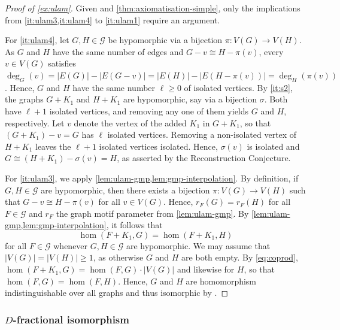 \documentclass[11pt]{scrartcl}
\theoremstyle{definition}
\theoremstyle{plain}
\theoremstyle{remark}
\newcommand{\G}{\mathcal{G}}
\begin{document}
    \begin{proof}[Proof of \cref{ex:ulam}]
		Given \cite{lovasz_operations_1967} and \cref{thm:axiomatisation-simple},
		only the implications from \cref{it:ulam3,it:ulam4} to \cref{it:ulam1} require an argument.

        For \cref{it:ulam4},
		let $G, H \in \G$ be hypomorphic via a bijection $\pi \colon V(G) \to V(H)$.
		As $G$ and $H$ have the same number of edges and $G - v \cong H - \pi(v)$,
		every $v \in V(G)$ satisfies
		$\deg_G(v) = |E(G)| - |E(G-v)| = |E(H)| - |E(H - \pi(v))| = \deg_H(\pi(v))$.
		Hence, $G$ and $H$ have the same number $\ell \geq 0$ of isolated vertices.
		By \cref{it:s2}, the graphs $G + K_1$ and $H + K_1$ are hypomorphic,
		say via a bijection $\sigma$.
		Both have $\ell + 1$ isolated vertices,
		and removing any one of them yields $G$ and $H$, respectively.
		Let $v$ denote the vertex of the added $K_1$ in $G + K_1$,
		so that $(G + K_1) - v = G$ has $\ell$ isolated vertices.
		Removing a non-isolated vertex of $H + K_1$ leaves the $\ell+1$ isolated vertices isolated.
		Hence, $\sigma(v)$ is isolated and $G \cong (H + K_1) - \sigma(v) = H$, as asserted by the Reconstruction Conjecture.

        For \cref{it:ulam3},
        we apply \cref{lem:ulam-gmp,lem:gmp-interpolation}.
        By definition, if $G, H \in \G$ are hypomorphic, 
        then there exists a bijection $\pi \colon V(G) \to V(H)$ such that $G - v \cong H- \pi(v)$ for all $v \in V(G)$.
        Hence, $r_F(G) = r_F(H)$ for all $F \in \G$ and $r_F$ the graph motif parameter from \cref{lem:ulam-gmp}.
        By \cref{lem:ulam-gmp,lem:gmp-interpolation},
        it follows that
        \[
            \hom(F + K_1, G) =\hom(F+K_1, H)
        \]
        for all $F \in \G$ whenever $G, H \in \G$ are hypomorphic.
        We may assume that $|V(G)| = |V(H)| \geq 1$, as otherwise $G$ and $H$ are both empty.
        By \eqref{eq:coprod},
        $\hom(F + K_1, G) = \hom(F, G) \cdot |V(G)|$ and likewise for $H$,
        so that $\hom(F, G) = \hom(F, H)$.
        Hence, $G$ and $H$ are homomorphism indistinguishable over all graphs and thus isomorphic by \cite{lovasz_operations_1967}.
	\end{proof}

    

	\subsubsection{\texorpdfstring{$D$}{D}-fractional isomorphism}
    
\end{document}
